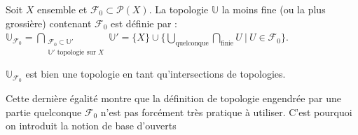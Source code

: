 \begin{definition}
     Soit $X$ ensemble et $\mathcal{F}_0\subset \mathcal{P}(X)$. La topologie $\mathbb{U}$ la moins fine (ou la plus grossière) contenant $\mathcal{F}_0$ est définie par : \\
     $\mathbb{U}_{\mathcal{F}_0}=\bigcap_{\substack{{\mathcal{F}_0 \subset \mathbb{U}'} \\ {\mathbb{U}' \text{ topologie sur } X}}} \mathbb{U}' = \{X\} \cup \{ \bigcup_{\text{quelconque}} \bigcap_{\text{finie}} U ~|~ U \in \mathcal{F}_0\}$. 
     
$\mathbb{U}_{\mathcal{F}_0}$ est bien une topologie en tant qu'intersections de topologies.
\end{definition}

Cette dernière égalité montre que la définition de topologie engendrée par une partie quelconque $\mathcal{F}_0$ n'est pas forcément très pratique à utiliser. C'est pourquoi on introduit la notion de base d'ouverts

